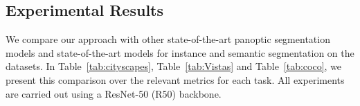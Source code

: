 \documentclass[10pt,twocolumn]{article}
\begin{document}
\begin{table*}{}
\centering
\caption{\textbf{COCO (Test-dev) Panoptic Segmentation Results.} We report TASCNet single model performance on COCO test-dev server without any test-time augmentation. We compare our model to the challenge entries on the panoptic segmentation leaderboard that also uses unified networks.}
\label{tab:coco}
\end{table*}
\subsection{Experimental Results}
We compare our approach with other state-of-the-art panoptic segmentation models and state-of-the-art models for instance and semantic segmentation on the  datasets. In Table~\ref{tab:cityscapes}, Table~\ref{tab:Vistas} and Table~\ref{tab:coco}, we present this comparison over the relevant metrics for each task. All experiments are carried out using a ResNet-50 (R50) backbone.
\end{document}
